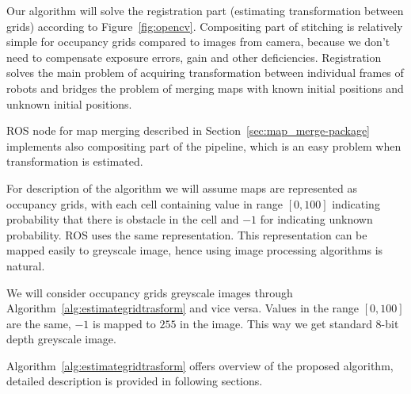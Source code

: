 Our algorithm will solve the registration part (estimating transformation between grids) according to Figure~\ref{fig:opencv}. Compositing part of stitching is relatively simple for occupancy grids compared to images from camera, because we don't need to compensate exposure errors, gain and other deficiencies. Registration solves the main problem of acquiring transformation between individual frames of robots and bridges the problem of merging maps with known initial positions and unknown initial positions.

\gls{ROS} node for map merging described in Section~\ref{sec:map_merge-package} implements also compositing part of the pipeline, which is an easy problem when transformation is estimated.

For description of the algorithm we will assume maps are represented as occupancy grids, with each cell containing value in range $[0,100]$ indicating probability that there is obstacle in the cell and $-1$ for indicating unknown probability. \gls{ROS} uses the same representation. This representation can be mapped easily to greyscale image, hence using image processing algorithms is natural.

We will consider occupancy grids greyscale images through Algorithm~\ref{alg:estimategridtrasform} and vice versa. Values in the range $[0,100]$ are the same, $-1$ is mapped to $255$ in the image. This way we get standard $8$-bit depth greyscale image.

Algorithm~\ref{alg:estimategridtrasform} offers overview of the proposed algorithm, detailed description is provided in following sections.


